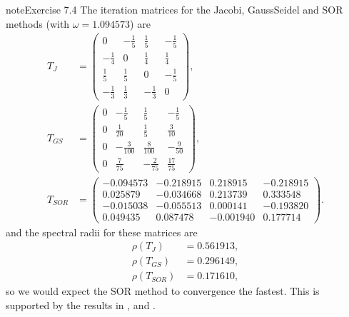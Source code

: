 \documentclass[letterpaper,10pt,english]{jupyterBook}
\begin{document}
\begin{sphinxadmonition}{note}{Exercise 7.4}
\sphinxAtStartPar
The iteration matrices for the Jacobi, Gauss\sphinxhyphen{}Seidel and SOR methods (with \(\omega = 1.094573\)) are
\begin{align*}
    T_J &= \begin{pmatrix} 0 & -\frac{1}{5} & \frac{1}{5} & -\frac{1}{5} \\ -\frac{1}{4} & 0 & \frac{1}{4} & \frac{1}{4} \\ \frac{1}{5} & \frac{1}{5} & 0 & -\frac{1}{5} \\ -\frac{1}{3} & \frac{1}{3} & -\frac{1}{3} & 0 \end{pmatrix}, \\
    T_{GS} &= \begin{pmatrix} 0 & -\frac{1}{5} & \frac{1}{5} & -\frac{1}{5} \\ 0 & \frac{1}{20} & \frac{1}{5} & \frac{3}{10} \\ 0 & -\frac{3}{100} & \frac{8}{100} & -\frac{9}{50} \\ 0 & \frac{7}{75} & -\frac{2}{75} & \frac{17}{75} \end{pmatrix}, \\
    T_{SOR} &= \begin{pmatrix} -0.094573 & -0.218915 & 0.218915 & -0.218915 \\ 0.025879 & -0.034668 & 0.213739 & 0.333548 \\ -0.015038 & -0.055513 & 0.000141 & -0.193820 \\ 0.049435 & 0.087478 & -0.001940 & 0.177714 \end{pmatrix}.
\end{align*}
\sphinxAtStartPar
and the spectral radii for these matrices are
\begin{align*}
    \rho(T_J) &= 0.561913, \\
    \rho(T_{GS}) &= 0.296149, \\
    \rho(T_{SOR}) &= 0.171610,
\end{align*}
\sphinxAtStartPar
so we would expect the SOR method to convergence the fastest. This is supported by the results in {\hyperref[\detokenize{7_Indirect_methods/7.6_Indirect_methods_exercises:ex7-1}]{}}, {\hyperref[\detokenize{7_Indirect_methods/7.6_Indirect_methods_exercises:ex7-2}]{}} and {\hyperref[\detokenize{7_Indirect_methods/7.6_Indirect_methods_exercises:ex7-3}]{}}.
\end{sphinxadmonition}
\end{document}
